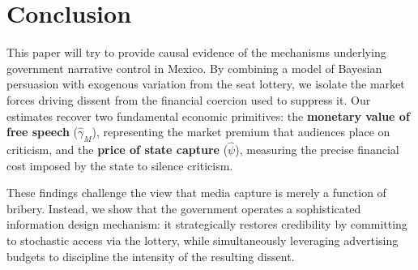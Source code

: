\documentclass[12pt]{article}
\begin{document}
\section{Conclusion}

This paper will try to provide causal evidence of the mechanisms underlying government narrative control in Mexico. By combining a model of Bayesian persuasion with exogenous variation from the seat lottery, we isolate the market forces driving dissent from the financial coercion used to suppress it. Our estimates recover two fundamental economic primitives: the \textbf{monetary value of free speech} ($\widehat\gamma_M$), representing the market premium that audiences place on criticism, and the \textbf{price of state capture} ($\widehat{\psi}$), measuring the precise financial cost imposed by the state to silence criticism.

These findings challenge the view that media capture is merely a function of bribery. Instead, we show that the government operates a sophisticated information design mechanism: it strategically restores credibility by committing to stochastic access via the lottery, while simultaneously leveraging advertising budgets to discipline the intensity of the resulting dissent. 
\clearpage


\end{document}
